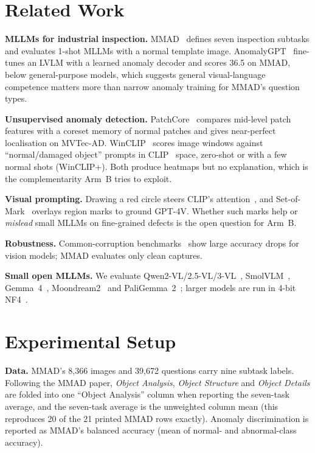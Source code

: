 \documentclass[conference]{IEEEtran}
\newcommand{\armB}{Arm~B}
\begin{document}
\section{Related Work}

\textbf{MLLMs for industrial inspection.} MMAD~\cite{jiang2025mmad} defines seven
inspection subtasks and evaluates 1-shot MLLMs with a normal template image.
AnomalyGPT~\cite{gu2024anomalygpt} fine-tunes an LVLM with a learned anomaly
decoder and scores 36.5 on MMAD, below general-purpose models, which suggests
general visual-language competence matters more than narrow anomaly training for
MMAD's question types.

\textbf{Unsupervised anomaly detection.} PatchCore~\cite{roth2022patchcore} compares
mid-level patch features with a coreset memory of normal patches and gives
near-perfect localisation on MVTec-AD. WinCLIP~\cite{jeong2023winclip} scores image
windows against ``normal/damaged object'' prompts in CLIP~\cite{radford2021clip}
space, zero-shot or with a few normal shots (WinCLIP+). Both produce heatmaps but no
explanation, which is the complementarity \armB{} tries to exploit.

\textbf{Visual prompting.} Drawing a red circle steers CLIP's
attention~\cite{shtedritski2023red}, and Set-of-Mark~\cite{yang2023som} overlays
region marks to ground GPT-4V. Whether such marks help or \emph{mislead} small MLLMs
on fine-grained defects is the open question for \armB.

\textbf{Robustness.} Common-corruption benchmarks~\cite{hendrycks2019benchmarking}
show large accuracy drops for vision models; MMAD evaluates only clean captures.

\textbf{Small open MLLMs.} We evaluate Qwen2-VL/2.5-VL/3-VL~\cite{wang2024qwen2vl,
bai2025qwen25vl,qwen3vl}, SmolVLM~\cite{marafioti2025smolvlm}, Gemma~4~\cite{gemma4},
Moondream2~\cite{moondream2} and PaliGemma~2~\cite{steiner2024paligemma2}; larger
models are run in 4-bit NF4~\cite{dettmers2023qlora}.

\section{Experimental Setup}\label{sec:setup}

\textbf{Data.} MMAD's 8{,}366 images and 39{,}672 questions carry nine subtask labels.
Following the MMAD paper, \emph{Object Analysis}, \emph{Object Structure} and
\emph{Object Details} are folded into one ``Object Analysis'' column when reporting
the seven-task average, and the seven-task average is the unweighted column mean
(this reproduces 20 of the 21 printed MMAD rows exactly). Anomaly discrimination is
reported as MMAD's balanced accuracy (mean of normal- and abnormal-class accuracy).
\end{document}

